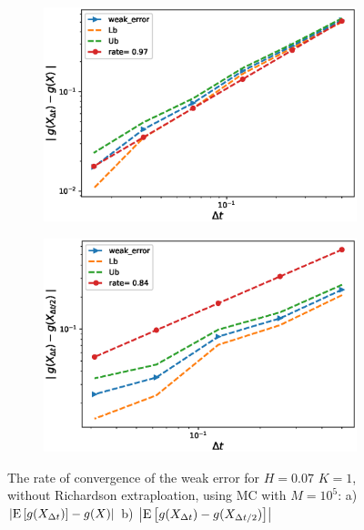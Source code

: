 \documentclass[11pt]{article}
\newcommand{\expt}[1]{\mathrm{E}\left[#1\right]}
\begin{document}
\begin{figure}[h!]
	\centering
	\begin{subfigure}{.4\textwidth}
		\centering
		\includegraphics[width=1\linewidth]{./figures/rBergomi_weak_error_rates/without_richardson/H_007/weak_convergence_order_Bergomi_H_007_K_1_M_10_5_CI_relative}
		\caption{}
		\label{fig:sub3}
	\end{subfigure}%
	\begin{subfigure}{.4\textwidth}
		\centering
		\includegraphics[width=1\linewidth]{./figures/rBergomi_weak_error_rates/without_richardson/H_007/weak_convergence_order_differences_Bergomi_H_007_K_1_M_10_5_CI_relative}
		\caption{}
		\label{fig:sub4}
	\end{subfigure}
	
	\caption{The rate of convergence of the weak error for $H=0.07$ $K=1$, without Richardson extraploation, using MC with $M=10^5$: a) $\abs{\expt{g(X_{\Delta t})}-g(X)}$  b) $\abs{\expt{g(X_{\Delta t})-g(X_{\Delta t/2})}}$ }
	\label{fig:Weak_rate_H_007_without_rich}
\end{figure}
\newpage
\end{document}
